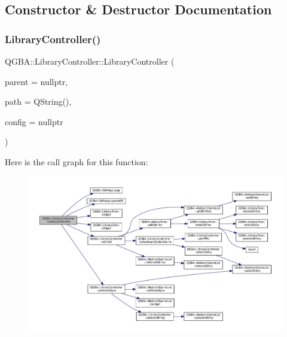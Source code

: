 \subsection{Constructor \& Destructor Documentation}
\mbox{\label{class_q_g_b_a_1_1_library_controller_a1a01950f96642877fa96bf535c5bfd87}} 
\subsubsection{\texorpdfstring{Library\+Controller()}{LibraryController()}}
{\footnotesize\ttfamily Q\+G\+B\+A\+::\+Library\+Controller\+::\+Library\+Controller (\begin{DoxyParamCaption}\item[{Q\+Widget $\ast$}]{parent = {\ttfamily nullptr},  }\item[{const Q\+String \&}]{path = {\ttfamily QString()},  }\item[{\mbox{\hyperlink{class_q_g_b_a_1_1_config_controller}{Config\+Controller}} $\ast$}]{config = {\ttfamily nullptr} }\end{DoxyParamCaption})}

Here is the call graph for this function\+:
\nopagebreak
\begin{figure}[H]
\begin{center}
\leavevmode
\includegraphics[width=350pt]{class_q_g_b_a_1_1_library_controller_a1a01950f96642877fa96bf535c5bfd87_cgraph}
\end{center}
\end{figure}
\mbox{\label{class_q_g_b_a_1_1_library_controller_ae35abb57acd9caa2d2380486d3fafd75}} 
